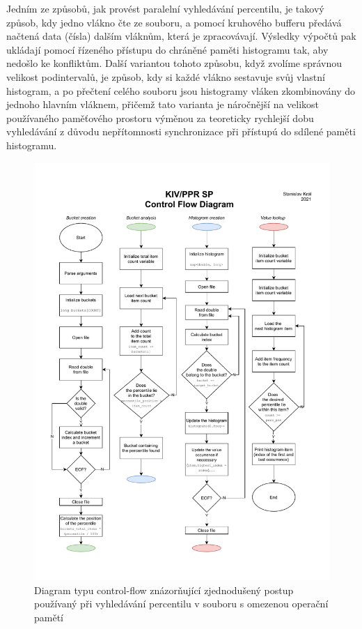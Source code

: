 \documentclass[12pt, a4paper]{article}
\begin{document}
Jedním ze způsobů, jak provést paralelní vyhledávání percentilu, je takový způsob, kdy jedno vlákno čte ze souboru, a pomocí kruhového bufferu předává načtená data (čísla) dalším vláknům, která je zpracovávají. Výsledky výpočtů pak ukládají pomocí řízeného přístupu do chráněné paměti histogramu tak, aby nedošlo ke konfliktům. 
Další variantou tohoto způsobu, když zvolíme správnou velikost podintervalů, je způsob, kdy si každé vlákno sestavuje svůj vlastní histogram, a po přečtení celého souboru jsou histogramy vláken zkombinovány do jednoho hlavním vláknem, přičemž tato varianta je náročnější na velikost používaného paměťového prostoru výměnou za teoreticky rychlejší dobu vyhledávání z důvodu nepřítomnosti synchronizace při přístupú do sdílené paměti histogramu.

\begin{figure}[!ht]
    \centering 
    \includegraphics[width=1.038125\textwidth]{pdf/cfd.pdf}
    \caption{Diagram typu control-flow znázorňující zjednodušený postup používaný při vyhledávání percentilu v souboru s omezenou operační pamětí}
\end{figure}
\end{document}
